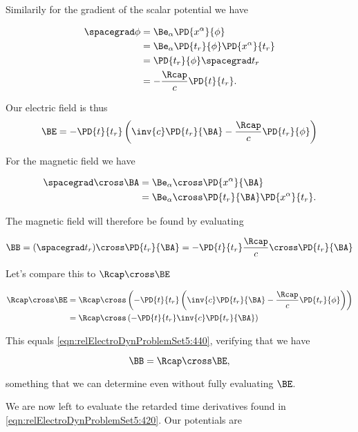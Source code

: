 Similarily for the gradient of the scalar potential we have

\begin{align*}
\spacegrad \phi 
&=
\Be_\alpha \PD{x^\alpha}{\phi} \\
&=
\Be_\alpha \PD{t_r}{\phi} \PD{x^\alpha}{t_r} \\
&=
\PD{t_r}{\phi} \spacegrad t_r \\
&=
- \frac{\Rcap}{c} \PD{t}{t_r}.
\end{align*}

Our electric field is thus
\begin{equation}\label{eqn:relElectroDynProblemSet5:420}
\BE = - \PD{t}{t_r} \left( \inv{c} \PD{t_r}{\BA} - \frac{\Rcap}{c} \PD{t_r}{\phi} \right)
\end{equation}

For the magnetic field we have

\begin{align*}
\spacegrad \cross \BA
&=
\Be_\alpha \cross \PD{x^\alpha}{\BA} \\
&=
\Be_\alpha \cross 
\PD{t_r}{\BA} \PD{x^\alpha}{t_r}.
\end{align*}

The magnetic field will therefore be found by evaluating 

\begin{equation}\label{eqn:relElectroDynProblemSet5:440}
\BB = (\spacegrad t_r) \cross \PD{t_r}{\BA} = - \PD{t}{t_r} \frac{\Rcap}{c} \cross \PD{t_r}{\BA} 
\end{equation}

Let's compare this to $\Rcap \cross \BE$ 

\begin{align*}
\Rcap \cross \BE 
&= \Rcap \cross \left( 
- \PD{t}{t_r} \left( \inv{c} \PD{t_r}{\BA} - \frac{\Rcap}{c} \PD{t_r}{\phi} \right) \right) \\
&= \Rcap \cross \left( - \PD{t}{t_r} \inv{c} \PD{t_r}{\BA} \right)
\end{align*}

This equals \ref{eqn:relElectroDynProblemSet5:440}, verifying that we have

\begin{equation}\label{eqn:relElectroDynProblemSet5:n}
\BB = \Rcap \cross \BE,
\end{equation}

something that we can determine even without fully evaluating $\BE$.

We are now left to evaluate the retarded time derivatives found in \ref{eqn:relElectroDynProblemSet5:420}.  Our potentials are

